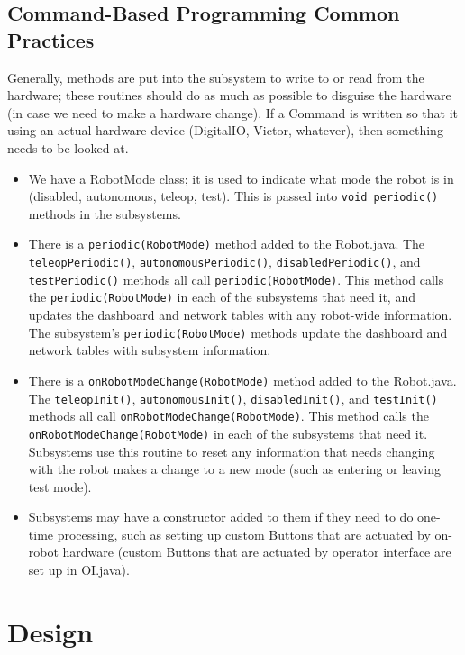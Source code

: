 \documentclass[]{article}
\begin{document}
\subsection {Command-Based Programming Common Practices}
Generally, methods are put into the subsystem to write to or read from the hardware; these routines should do as much as possible to disguise the hardware (in case we need to make a hardware change). 
If a Command is written so that it using an actual hardware device (DigitalIO, Victor, whatever), then something needs to be looked at.
\begin{itemize}
\item We have a RobotMode class; it is used to indicate what mode the robot is in (disabled, autonomous, teleop, test).
This is passed into \lstinline[]|void periodic()| methods in the subsystems.
\item There is a \lstinline[]|periodic(RobotMode)| method added to the Robot.java.
The \lstinline[]|teleopPeriodic()|,  \lstinline[]|autonomousPeriodic()|,  \lstinline[]|disabledPeriodic()|, and  \lstinline[]|testPeriodic()| methods all call  \lstinline[]|periodic(RobotMode)|.
This method calls the \lstinline[]|periodic(RobotMode)| in each of the subsystems that need it, and updates the dashboard and network tables with any robot-wide information.
The subsystem's \lstinline[]|periodic(RobotMode)| methods update the dashboard and network tables with subsystem information.
\item There is a \lstinline[]|onRobotModeChange(RobotMode)| method added to the Robot.java.
The \lstinline[]|teleopInit()|,  \lstinline[]|autonomousInit()|,  \lstinline[]|disabledInit()|, and  \lstinline[]|testInit()| methods all call  \lstinline[]|onRobotModeChange(RobotMode)|.
This method calls the \lstinline[]|onRobotModeChange(RobotMode)| in each of the subsystems that need it.
Subsystems use this routine to reset any information that needs changing with the robot makes a change to a new mode (such as entering or leaving test mode).
\item Subsystems may have a constructor added to them if they need to do one-time processing, such as setting up custom Buttons that are actuated by on-robot hardware (custom Buttons that are actuated by operator interface are set up in OI.java).
\end{itemize}

\newpage

\section{Design}
\end{document}
